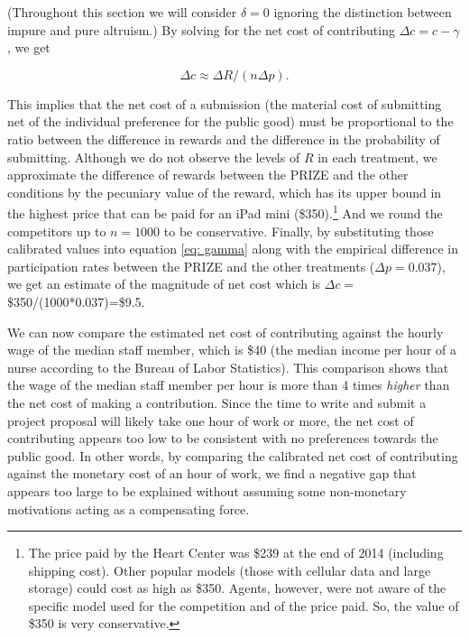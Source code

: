 \documentclass[11pt]{article}
\begin{document}
(Throughout this section we will consider \(\delta=0\) ignoring the
distinction between impure and pure altruism.) By solving for the net
cost of contributing \(\Delta c=c-\gamma\), we get

\begin{equation}
  \label{eq: gamma}
  \Delta c\approx  \Delta R / (n\Delta p). 
\end{equation}

This implies that the net cost of a submission (the material cost of
submitting net of the individual preference for the public good) must be
proportional to the ratio between the difference in rewards and the
difference in the probability of submitting. Although we do not observe
the levels of \(R\) in each treatment, we approximate the difference of
rewards between the PRIZE and the other conditions by the pecuniary
value of the reward, which has its upper bound in the highest price that
can be paid for an iPad mini (\$350).\footnote{The price paid by the
  Heart Center was \$239 at the end of 2014 (including shipping cost).
  Other popular models (those with cellular data and large storage)
  could cost as high as \$350. Agents, however, were not aware of the
  specific model used for the competition and of the price paid. So, the
  value of \$350 is very conservative.} And we round the competitors up
to \(n=1000\) to be conservative. Finally, by substituting those
calibrated values into equation \eqref{eq: gamma} along with the
empirical difference in participation rates between the PRIZE and the
other treatments (\(\Delta p=0.037\)), we get an estimate of the
magnitude of net cost which is \(\Delta c=\) \$350/(1000*0.037)=\$9.5.

We can now compare the estimated net cost of contributing against the
hourly wage of the median staff member, which is \$40 (the median income
per hour of a nurse according to the Bureau of Labor Statistics). This
comparison shows that the wage of the median staff member per hour is
more than 4 times \emph{higher} than the net cost of making a
contribution. Since the time to write and submit a project proposal will
likely take one hour of work or more, the net cost of contributing
appears too low to be consistent with no preferences towards the public
good. In other words, by comparing the calibrated net cost of
contributing against the monetary cost of an hour of work, we find a
negative gap that appears too large to be explained without assuming
some non-monetary motivations acting as a compensating force.
\end{document}
